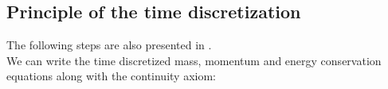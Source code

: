 \subsection{Principle of the time discretization}
The following steps are also presented in \textcite{GerschenfeldPolyMAC2022}. \\
We can write the time discretized mass, momentum and energy conservation equations along with the continuity axiom:


